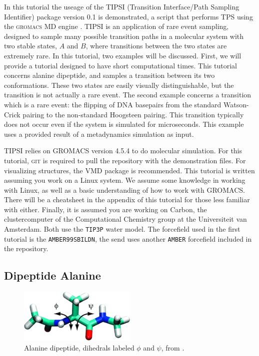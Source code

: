 \documentclass[]{article}
\begin{document}
In this tutorial the useage of the \textsc{TIPSI} (Transition Interface/Path Sampling Identifier) package version 0.1 is demonstrated, a script that performs TPS using the \textsc{gromacs} MD engine \cite{gromacs, tipsi}. \textsc{TIPSI} is an application of rare event sampling, designed to sample many possible transition paths in a molecular system with two stable states, $A$ and $B$, where transitions between the two states are extremely rare. In this tutorial, two examples will be discussed. First, we will provide a tutorial designed to have short computational times. This tutorial concerns alanine dipeptide, and samples a transition between its two conformations. These two states are easily visually distinguishable, but the transition is not actually a rare event. The second example concerns a transition which is a rare event: the flipping of DNA basepairs from the standard Watson-Crick pairing to the non-standard Hoogsteen pairing. This transition typically does not occur even if the system is simulated for microseconds. This example uses a provided result of a metadynamics simulation as input. 

\textsc{TIPSI} relies on \textsc{GROMACS} version 4.5.4 to do molecular simulation. For this tutorial, \textsc{git} is required to pull the repository with the demonstration files. For visualizing structures, the VMD package is recommended. This tutorial is written assuming you work on a Linux system. We assume some knowledge in working with Linux, as well as a basic understanding of how to work with \textsc{GROMACS}. There will be a cheatsheet in the appendix of this tutorial for those less familiar with either. Finally, it is assumed you are working on Carbon, the clustercomputer of the Computational Chemistry group at the Universiteit van Amsterdam.
Both use the \texttt{TIP3P} water model. The forcefield used in the first tutorial is the \texttt{AMBER99SBILDN}, the send uses another \texttt{AMBER} forcefield included in the repository.

\subsection*{Dipeptide Alanine}

\begin{figure}[ht]
    \centering
    \includegraphics[width=0.5\textwidth]{images/alanine.png}
    \caption{Alanine dipeptide, dihedrals labeled $\phi$ and $\psi$, from \cite{alaninerep}.}
    \label{fig:alanine}
\end{figure}
\end{document}
